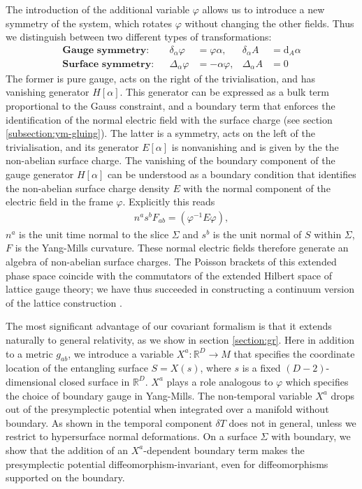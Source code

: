 \documentclass[a4paper,11pt]{article}
\newcommand{\beq}{\begin{eqnarray}}
\newcommand{\eeq}{\end{eqnarray}}
\def\rd{\mathrm{d}}
\newcommand{\R}{\mathbb{R}}
\begin{document}
The introduction of the additional variable $\varphi$ allows us to introduce a new symmetry of the system, which rotates $\varphi$ without changing the other fields.
Thus we distinguish between two different types of transformations:
\begin{align}
\textbf{Gauge symmetry:}& &\delta_\alpha \varphi &= \varphi \alpha, & \delta_\alpha A &= \rd_A \alpha \\
\textbf{Surface symmetry:}& &\Delta_\alpha \varphi &= -\alpha \varphi, & \Delta_\alpha A &= 0
\end{align}
The former is pure gauge, acts on the right of the trivialisation, and has vanishing generator $H[\alpha]$.
This generator can be expressed as a bulk term proportional to the Gauss constraint, and a boundary term that enforces the identification of the normal electric field with the surface charge (see section \ref{subsection:ym-gluing}).
The latter is a symmetry, acts on the left of the trivialisation, and its generator $E[\alpha]$ is nonvanishing and is given by the the non-abelian surface charge.
The vanishing of the boundary component of the gauge generator $H[\alpha]$ can be understood as a boundary condition that identifies the non-abelian surface charge density $E$ with the normal component  of the electric field in the frame $\varphi$. Explicitly this reads 
\beq \label{dressedE}
n^a s^b F_{ab} =(\varphi^{-1} E \varphi) ,
\eeq
$n^a$ is the unit time normal to the slice $\Sigma$ and  $s^b$ is the unit normal of $S$ within $\Sigma$, $F$ is the Yang-Mills curvature. 
These normal electric fields therefore generate an algebra of non-abelian surface charges.
The Poisson brackets of this extended phase space coincide with the commutators of the extended Hilbert space of lattice gauge theory; we have thus succeeded in constructing a continuum version of the lattice construction \cite{Donnelly2011}.

The most significant advantage of our covariant formalism is that it extends naturally to general relativity, as we show in section \ref{section:gr}.
Here in addition to a metric $g_{ab}$, we introduce a variable $X^a : \R^D \to M $ that specifies the coordinate location of the entangling surface $S = X(s)$, where $s$ is a fixed $(D-2)$-dimensional closed surface in $\mathbb{R}^D$.
$X^a$ plays a role analogous to  $\varphi$ which specifies the choice of boundary gauge in Yang-Mills.
The non-temporal variable $X^a$ drops out of the presymplectic potential when integrated over a manifold without boundary. As shown in \cite{Freidel:2013jfa} the temporal component $\delta T$ does not in general, unless we restrict to hypersurface normal deformations.
On a surface $\Sigma$ with boundary, we show that the addition of an $X^a$-dependent boundary term makes the presymplectic potential diffeomorphism-invariant, even for diffeomorphisms supported on the boundary.
\end{document}
